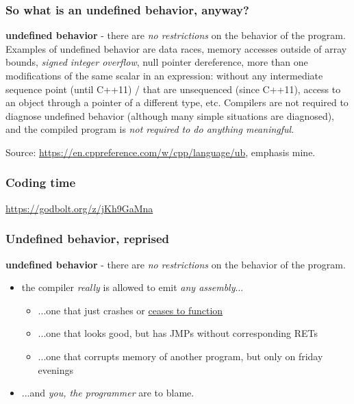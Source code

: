 \documentclass[aspectratio=169]{beamer}
\newcommand{\greenemph}[1]{\textit{\textcolor{clGreen}{#1}}}
\begin{document}
\begin{frame}
\frametitle{So what is an undefined behavior, anyway?}
\textbf{\textcolor{clViolet}{undefined behavior}} - there are \greenemph{no restrictions} on the behavior of the program. Examples of undefined behavior are data races, memory accesses outside of array bounds, \greenemph{signed integer overflow}, null pointer dereference, more than one modifications of the same scalar in an expression: without any intermediate sequence point (until C++11) / that are unsequenced (since C++11), access to an object through a pointer of a different type, etc. Compilers are not required to diagnose undefined behavior (although many simple situations are diagnosed), and the compiled program is \greenemph{not required to do anything meaningful}.

\begin{flushright}
{\small Source: \url{https://en.cppreference.com/w/cpp/language/ub}, emphasis mine.}
\end{flushright}

\end{frame}

\begin{frame}
\frametitle{Coding time}
\centering \url{https://godbolt.org/z/jKh9GaMna}
\end{frame}

\begin{frame}
\frametitle{Undefined behavior, reprised}
\textbf{\textcolor{clViolet}{undefined behavior}} - there are \greenemph{no restrictions} on the behavior of the program.
\vspace{1cm}
{\centering
\begin{itemize}
  \item the compiler \greenemph{really} is allowed to emit \greenemph{any assembly}...
  \begin{itemize}
    \item ...one that just crashes or \href{https://en.wikipedia.org/wiki/Halt\_and\_Catch\_Fire\_(computing)}{ceases to function}
    \item ...one that looks good, but has JMPs without corresponding RETs
    \item ...one that corrupts memory of another program, but only on friday evenings
  \end{itemize}
  \item ...and \greenemph{you, the programmer} are to blame.
\end{itemize}
}
\end{frame}
\end{document}
